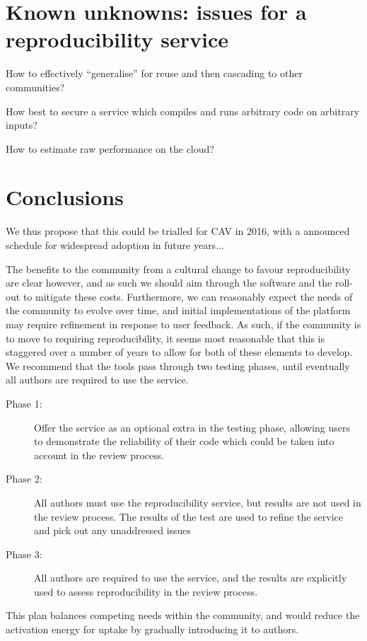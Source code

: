 \documentclass{llncs}
\begin{document}

\section{Known unknowns: issues for a reproducibility service}\label{issues} 

How to effectively ``generalise'' for reuse and then cascading to other communities?

How best to secure a service which compiles and runs arbitrary code on arbitrary inputs?

How to estimate raw performance on the cloud?

\section{Conclusions}\label{concl}
We thus propose that this could be trialled for CAV in 2016, with a
announced schedule for widespread adoption in future years...

The benefits to the community from a cultural change to favour
reproducibility are clear however, and as such we should aim through
the software and the roll-out to mitigate these costs. Furthermore, we
can reasonably expect the needs of the community to evolve over time,
and initial implementations of the platform may require refinement in
response to user feedback. As such, if the community is to move to
requiring reproducibility, it seems most reasonable that this is
staggered over a number of years to allow for both of these elements
to develop. We recommend that the tools pass through two testing
phases, until eventually all authors are required to use the service.

\begin{description}
\item[Phase 1:] Offer the service as an optional extra in the testing phase, allowing users to demonstrate 
the reliability of their code which could be taken into account in the review process.
\item[Phase 2:] All authors must use the reproducibility service, but results are not used in the review
process. The results of the test are used to refine the service and pick out any unaddressed issues
\item[Phase 3:] All authors are required to use the service, and the results are explicitly used to 
assess reproducibility in the review process.
\end{description}

This plan balances competing needs within the community, and would reduce the activation
energy for uptake by gradually introducing it to authors.



\end{document}
